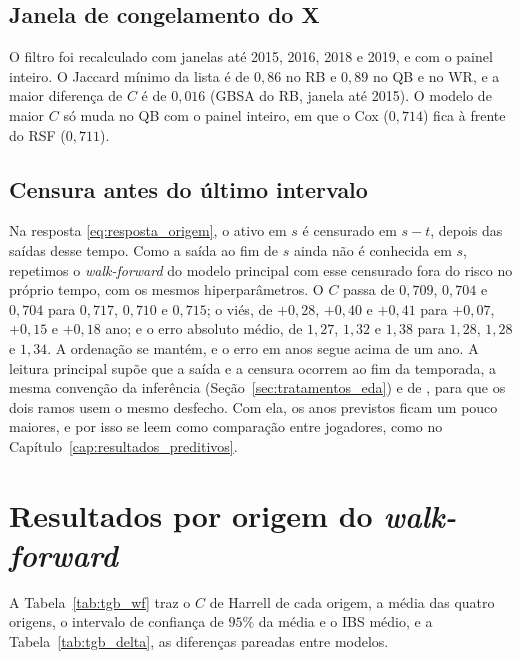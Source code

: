 \subsection{Janela de congelamento do X}
\label{subsec:apend_janela_x}

O filtro foi recalculado com janelas até 2015, 2016, 2018 e 2019, e com o painel inteiro. O Jaccard mínimo da lista é de $0{,}86$ no RB e $0{,}89$ no QB e no WR, e a maior diferença de $C$ é de $0{,}016$ (GBSA do RB, janela até 2015). O modelo de maior $C$ só muda no QB com o painel inteiro, em que o Cox ($0{,}714$) fica à frente do RSF ($0{,}711$).

\subsection{Censura antes do último intervalo}
\label{subsec:apend_censura_pred}

Na resposta \eqref{eq:resposta_origem}, o ativo em $s$ é censurado em $s-t$, depois das saídas desse tempo. Como a saída ao fim de $s$ ainda não é conhecida em $s$, repetimos o \textit{walk-forward} do modelo principal com esse censurado fora do risco no próprio tempo, com os mesmos hiperparâmetros. O $C$ passa de $0{,}709$, $0{,}704$ e $0{,}704$ para $0{,}717$, $0{,}710$ e $0{,}715$; o viés, de $+0{,}28$, $+0{,}40$ e $+0{,}41$ para $+0{,}07$, $+0{,}15$ e $+0{,}18$ ano; e o erro absoluto médio, de $1{,}27$, $1{,}32$ e $1{,}38$ para $1{,}28$, $1{,}28$ e $1{,}34$. A ordenação se mantém, e o erro em anos segue acima de um ano. A leitura principal supõe que a saída e a censura ocorrem ao fim da temporada, a mesma convenção da inferência (Seção~\ref{sec:tratamentos_eda}) e de \citet{ducking2015}, para que os dois ramos usem o mesmo desfecho. Com ela, os anos previstos ficam um pouco maiores, e por isso se leem como comparação entre jogadores, como no Capítulo~\ref{cap:resultados_preditivos}.

\section{Resultados por origem do \textit{walk-forward}}
\label{sec:ap_wf_origens}

A Tabela~\ref{tab:tgb_wf} traz o $C$ de Harrell de cada origem, a média das quatro origens, o intervalo de confiança de $95\%$ da média e o IBS médio, e a Tabela~\ref{tab:tgb_delta}, as diferenças pareadas entre modelos.

